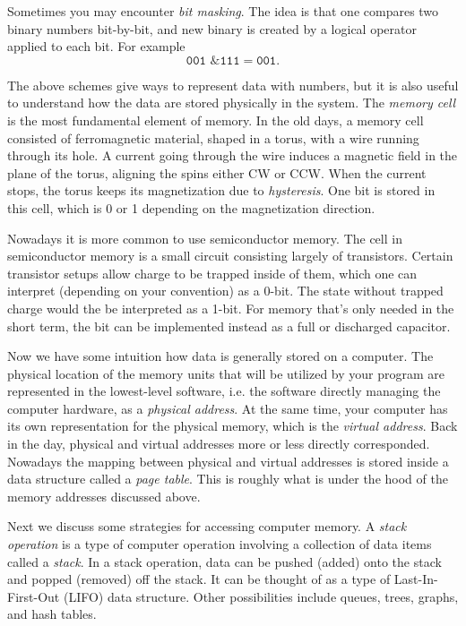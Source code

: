 Sometimes you may encounter {\it bit masking}. The idea is that one compares
two binary numbers bit-by-bit, and new binary is created by a logical operator
applied to each bit. For example
\begin{equation*}
  \texttt{001 \& 111} = \texttt{001}. 
\end{equation*}

The above schemes give ways to represent data with numbers, but it is also
useful to understand how the data are stored physically in the system.
The {\it memory cell} is the most fundamental element of memory. In the old
days, a memory cell consisted of ferromagnetic material, shaped in a torus, with
a wire running through its hole. A current going through the wire induces a
magnetic field in the plane of the torus, aligning the spins either CW or CCW.
When the current stops, the torus keeps its magnetization due to 
{\it hysteresis}. One bit is stored in this cell, which is 0
or 1 depending on the magnetization direction.

Nowadays it is more common to use semiconductor memory. The cell in
semiconductor memory is a small circuit consisting largely of transistors.
Certain transistor setups allow charge to be trapped inside of them,
which one can interpret (depending on your convention) as a 0-bit. The state
without trapped charge would the be interpreted as a 1-bit.
For memory that's only needed in the short term, the bit can be implemented 
instead as a full or discharged capacitor.

Now we have some intuition how data is generally stored on a computer.
The physical location of the memory units that will be utilized by your
program are represented in the lowest-level software, i.e. the software
directly managing the computer hardware, as a {\it physical address}.
At the same time, your computer has its own representation for the physical
memory, which is the {\it virtual address}.
Back in the day, physical and virtual addresses more or less directly corresponded.
Nowadays the mapping between physical and virtual addresses is stored inside a
data structure called a {\it page table}.
This is roughly what is under the hood of the memory
addresses discussed above.

Next we discuss some strategies for accessing computer memory.
A {\it stack operation} is a type of computer operation involving a 
collection of data items called a {\it stack}. In a stack operation, data can be 
pushed (added) onto the stack and popped (removed) off the stack. It can be thought 
of as a type of Last-In-First-Out (LIFO) data structure.
Other possibilities include queues, trees, graphs, and hash tables.


